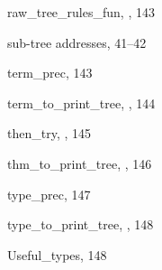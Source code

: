 \begin{theindex}
  \indexspace

  \item {\ptt raw\_tree\_rules\_fun}, , 143

  \indexspace

  \item sub-tree addresses, 41--42

  \indexspace

  \item {\ptt term\_prec}, 143
  \item {\ptt term\_to\_print\_tree}, , 144
  \item {\ptt then\_try}, , 145
  \item {\ptt thm\_to\_print\_tree}, , 146
  \item {\ptt type\_prec}, 147
  \item {\ptt type\_to\_print\_tree}, , 148

  \indexspace

  \item {\ptt Useful\_types}, 148

\end{theindex}
